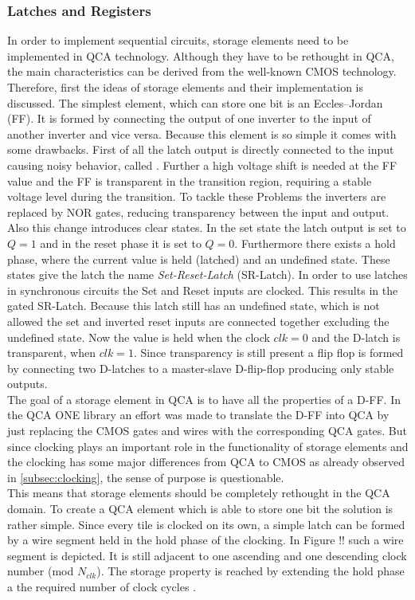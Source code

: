 \subsubsection{Latches and Registers}
In order to implement sequential circuits, storage elements need to be implemented in QCA technology. Although they have to be rethought in QCA, the main characteristics can be derived from the well-known CMOS technology. Therefore, first the ideas of storage elements and their implementation is discussed. 
The simplest element, which can store one bit is an Eccles–Jordan  (FF). It is formed by connecting the output of one inverter to the input of another inverter and vice versa. Because this element is so simple it comes with some drawbacks. First of all the latch output is directly connected to the input causing noisy behavior, called  \cite{hawkins2012cmos}. Further a high voltage shift is needed at the FF value and the FF is transparent in the transition region, requiring a stable voltage level during the transition. To tackle these Problems the inverters are replaced by NOR gates, reducing transparency between the input and output. Also this change introduces clear states. In the set state the latch output is set to $Q=1$ and in the reset phase it is set to $Q=0$. Furthermore there exists a hold phase, where the current value is held (latched) and an undefined state. These states give the latch the name \textit{Set-Reset-Latch} (SR-Latch). In order to use latches in synchronous circuits the Set and Reset inputs are clocked. This results in the gated SR-Latch. Because this latch still has an undefined state, which is not allowed the set and inverted reset inputs are connected together excluding the undefined state. Now the value is held when the clock $clk=0$ and the D-latch is transparent, when $clk=1$. Since transparency is still present a flip flop is formed by connecting two D-latches to a master-slave D-flip-flop producing only stable outputs.\\
The goal of a storage element in QCA is to have all the properties of a D-FF. In the QCA ONE library an effort was made to translate the D-FF into QCA by just replacing the CMOS gates and wires with the corresponding QCA gates. But since clocking plays an important role in the functionality of storage elements and the clocking has some major differences from QCA to CMOS as already observed in \ref{subsec:clocking}, the sense of purpose is questionable.\\
This means that storage elements should be completely rethought in the QCA domain. To create a QCA element which is able to store one bit the solution is rather simple. Since every tile is clocked on its own, a simple latch can be formed by a wire segment held in the hold phase of the clocking. In Figure !! such a wire segment is depicted. It is still adjacent to one ascending and one descending clock number (mod $N_{clk}$). The storage property is reached by extending the hold phase a the required number of clock cycles \cite{Walter}. 
